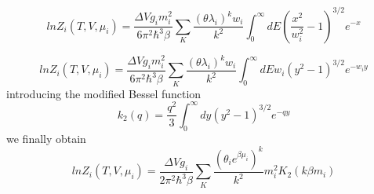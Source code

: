 \documentclass[12pt,a4paper]{book}
\begin{document}
	\begin{equation}
		ln Z_i(T,V,\mu_i)= \frac{\Delta V g_i m_i^2}{6 \pi^2\hbar^3 \beta} \sum_{K} \frac{(\theta \lambda_i)^k w_i}{k^2}  \int_{0}^{\infty} dE (\frac{x^2}{w_i^2}-1)^{3/2} e^{-x} 
	\end{equation}
	
	\begin{equation}
		ln Z_i(T,V,\mu_i)= \frac{\Delta V g_i m_i^2}{6 \pi^2\hbar^3 \beta} \sum_{K} \frac{(\theta \lambda_i)^k w_i}{k^2}  \int_{0}^{\infty} dE w_i (y^2-1)^{3/2} e^{-w_i y} 
	\end{equation}
	introducing the modified Bessel function 
	\begin{equation}
		k_2(q)= \frac{q^2}{3} \int_{0}^{\infty} dy (y^2-1)^{3/2} e^{-qy}
	\end{equation}
	we finally obtain
	\begin{equation}
		ln Z_i(T,V,\mu_i)= \frac{\Delta V g_i}{2\pi^2\hbar^3\beta} \sum_{K} \frac{(\theta_i e^{\beta \mu_i})^k}{k^2} m_i^2K_2(k\beta m_i)
	\end{equation}
	
	
	
	
	
	
	
	
	
	\printbibliography
	
\end{document}
